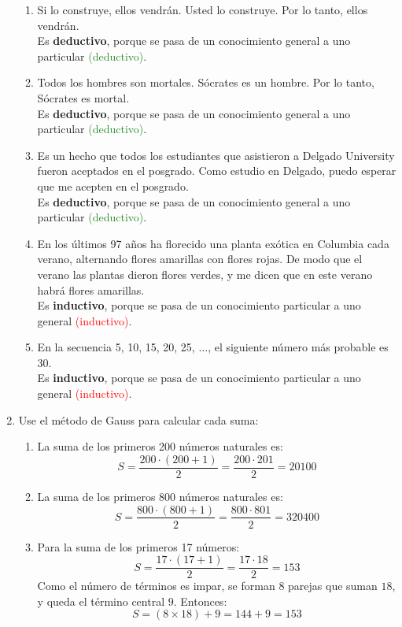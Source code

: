 \documentclass[12pt,letterpaper]{exam}
\begin{document}
\begin{enumerate}
\begin{enumerate}[label=\alph*)]
  \item Si lo construye, ellos vendrán. Usted lo construye. Por lo tanto, ellos vendrán. 
  \\ Es \textbf{deductivo}, porque se pasa de un conocimiento general a uno particular \textcolor{ForestGreen}{(deductivo)}.

  \item Todos los hombres son mortales. Sócrates es un hombre. Por lo tanto, Sócrates es mortal. 
  \\ Es \textbf{deductivo}, porque se pasa de un conocimiento general a uno particular \textcolor{ForestGreen}{(deductivo)}.

  \item Es un hecho que todos los estudiantes que asistieron a Delgado University fueron aceptados en el posgrado. Como estudio en Delgado, puedo esperar que me acepten en el posgrado. 
  \\ Es \textbf{deductivo}, porque se pasa de un conocimiento general a uno particular \textcolor{ForestGreen}{(deductivo)}.

  \item En los últimos 97 años ha florecido una planta exótica en Columbia cada verano, alternando flores amarillas con flores rojas. De modo que el verano las plantas dieron flores verdes, y me dicen que en este verano habrá flores amarillas. 
  \\ Es \textbf{inductivo}, porque se pasa de un conocimiento particular a uno general \textcolor{red}{(inductivo)}.

  \item En la secuencia 5, 10, 15, 20, 25, $\ldots$, el siguiente número más probable es 30. 
  \\ Es \textbf{inductivo}, porque se pasa de un conocimiento particular a uno general \textcolor{red}{(inductivo)}.
  \end{enumerate}

  \item  Use el método de Gauss para calcular cada suma:
 \begin{enumerate}[label=\alph*)]
  \item La suma de los primeros 200 números naturales es:
  \[
  S = \frac{200 \cdot (200+1)}{2} = \frac{200 \cdot 201}{2} = 20100
  \]

  \item La suma de los primeros 800 números naturales es:
  \[
  S = \frac{800 \cdot (800+1)}{2} = \frac{800 \cdot 801}{2} = 320400
  \]

  \item Para la suma de los primeros 17 números:
  \[
  S = \frac{17 \cdot (17+1)}{2} = \frac{17 \cdot 18}{2} = 153
  \]
  Como el número de términos es impar, se forman $8$ parejas que suman $18$, 
  y queda el término central $9$. Entonces:
  \[
  S = (8 \times 18) + 9 = 144 + 9 = 153
  \]
\end{enumerate}


\end{enumerate}
\end{document}
